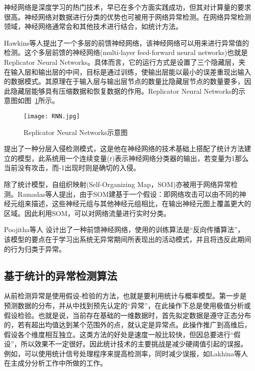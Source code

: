 神经网络是深度学习的热门技术，早已在多个方面实践成功，但其对计算量的要求很高。神经网络对数据进行分类的优势也可被用于网络异常检测。在网络异常检测领域，神经网络通常会和其他技术进行结合，如统计方法。


Hawkins等人\cite{hawk2002Outlier}提出了一个多层的前馈神经网络，该神经网络可以用来进行异常值的检测。这个多层前馈的神经网络(multi-layer feed-forward neural networks)也就是Replicator Neural Networks。具体而言，它的运行方式是设置了三个隐藏层，夹在输入层和输出层的中间，目标是通过训练，使输出层能以最小的误差重现出输入的数据模式。其原理在于输入层与输出层节点的数量比隐藏层节点的数量要多，因此隐藏层能够具有压缩数据和恢复数据的作用。Replicator Neural Networks的示意图如图~\ref{fig:rnn}所示。


\begin{figure}
    \centering
    \texttt{[image: RNN.jpg]}
    \caption{Replicator Neural Networks示意图}
    \label{fig:rnn}
  \end{figure}

  \citet{2001HIDE} 提出了一种分层入侵检测模式，这是他在神经网络的技术基础上搭配了统计方法建立的模型，此系统用一个连续变量($t$)表示神经网络分类器的输出，若变量为1那么当前没有攻击，而-1出现时则是确切的入侵。
  
  除了统计模型，自组织映射(Self-Organizing Map，SOM)亦被用于网络异常检测。Ramadas等人\cite{2003Detecting}提出，由于SOM建基于一个假设：即网络攻击可以由不同的神经元组来描述，这些神经元组与其他神经元组相比，在输出神经元图上覆盖更大的区域。因此利用SOM，可以对网络流量进行实时分类。
  
  Poojitha等人\cite{Poojitha2010} 设计出了一种前馈神经网络，使用的训练算法是“反向传播算法”，该模型的要点在于学习出系统无异常期间所表现出的活动模式，并且将违反此期间的行为归类于异常。

\subsection{基于统计的异常检测算法}
从前检测异常是使用假设-检验的方法，也就是要利用统计与概率模型。第一步是预测数据的分布，并从中找到预先认定的“异常”，在此操作下总是使用极值分析或假设检验。也就是说，当前存在基础的一维数据时，首先拟定数据是遵守正态分布的，若有超出均值达到某个范围外的点，就认定是异常点。此操作推广到高维后，假设各个维度相互独立。这类方法的好处是速度一般比较快，但因总要进行“假设”，所以效果不一定很好。因此统计技术的主要挑战是减少硬阈值引起的误报\cite{cormode2010algorithms}。例如，可以使用统计信号处理程序来提高检测率，同时减少误报，如Lakhina等人在主成分分析工作中所做的工作\cite{lakhina2004diagnosing,lakhina2004structural,lakhina2005mining}。

